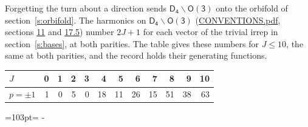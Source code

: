 \documentclass[10pt,a4paper]{article}
\newcommand{\needspace}[1]{\par\penalty-100\begingroup\dimen0=#1\relax\dimen2=\pagegoal
  \advance\dimen2-\pagetotal\ifdim\dimen0>\dimen2\relax\ifdim\dimen2>0pt\vfil\break\fi\fi
  \endgroup}
\numberwithin{equation}{section}
\newcommand{\grp}[1]{\mathsf{#1}}
\begin{document}
Forgetting the turn about a direction sends $\grp{D_{4}}\backslash\grp{O(3)}$ onto the orbifold of section~\ref{s:orbifold}.
The harmonics on $\grp{D_{4}}\backslash\grp{O(3)}$ (\href{../../CONVENTIONS.pdf}{CONVENTIONS.pdf}, sections \href{../../CONVENTIONS.pdf\#conv.11}{11} and \href{../../CONVENTIONS.pdf\#conv.17.5}{17.5}) number $2J + 1$ for each vector of the trivial irrep in section~\ref{s:bases}, at both parities. The table gives these numbers for $J \le 10$, the same at both parities, and the record holds their generating functions.
{\small\setlength{\tabcolsep}{4pt}\begin{longtable}{@{}lrrrrrrrrrrr@{}}\toprule
$J$ & 0 & 1 & 2 & 3 & 4 & 5 & 6 & 7 & 8 & 9 & 10\\\midrule\endhead
\bottomrule\endfoot\endlastfoot
$p = \pm 1$ & 1 & 0 & 5 & 0 & 18 & 11 & 26 & 15 & 51 & 38 & 63\\
\bottomrule\end{longtable}}
\needspace{103pt}
\end{document}
